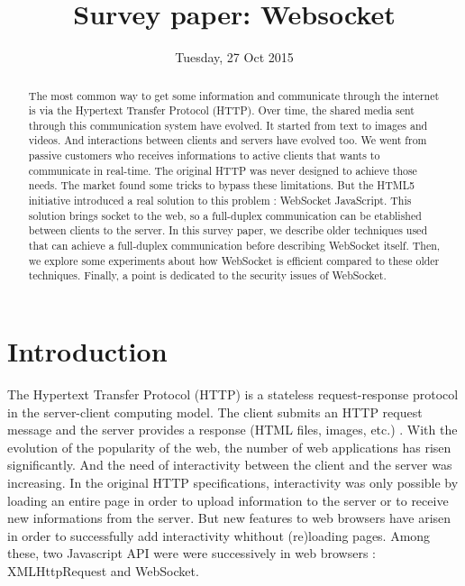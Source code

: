 \documentclass[journal,compsoc]{IEEEtran}
\newcommand{\ws}{WebSocket}
\begin{document}
\author{}

\title{Survey paper: Websocket}

\date{Tuesday, 27 Oct 2015}

\maketitle
\IEEEpeerreviewmaketitle



\begin{abstract}
The most common way to get some information and communicate through the internet is via the Hypertext Transfer Protocol (HTTP).
Over time, the shared media sent through this communication system have evolved.
It started from text to images and videos.
And interactions between clients and servers have evolved too.
We went from passive customers who receives informations to active clients that wants to communicate in real-time.
The original HTTP was never designed to achieve those needs.
The market found some tricks to bypass these limitations.
But the HTML5 initiative introduced a real solution to this problem : \ws{} JavaScript.
This solution brings socket to the web, so a full-duplex communication can be etablished between clients to the server.
In this survey paper, we describe older techniques used that can achieve a full-duplex communication before describing \ws{} itself.
Then, we explore some experiments about how \ws{} is efficient compared to these older techniques.
Finally, a point is dedicated to the security issues of \ws.
\end{abstract}


\section{Introduction}

The Hypertext Transfer Protocol (HTTP) is a stateless request-response protocol in the server-client computing model.
The client submits an HTTP request message and the server provides a response (HTML files, images, etc.) \cite{rfc2616}.
With the evolution of the popularity of the web, the number of web applications has risen significantly.
And the need of interactivity between the client and the server was increasing.
In the original HTTP specifications, interactivity was only possible by loading an entire page in order to upload information to the server or to receive new informations from the server.
But new features to web browsers have arisen in order to successfully add interactivity whithout (re)loading pages.
Among these, two Javascript API were were successively in web browsers : XMLHttpRequest and \ws.
\end{document}
